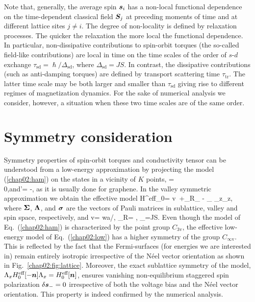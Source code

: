 Note that, generally, the average spin $\boldsymbol{s}_i$ has a non-local functional dependence on the time-dependent classical field $\boldsymbol{S}_j$ at preceding moments of time  and at different lattice sites $j\neq i$. The degree of non-locality is defined by relaxation processes. The quicker the relaxation the more local the functional dependence. In particular, non-dissipative contributions to spin-orbit torques (the so-called field-like contributions) are local in time on the time scales of the order of $s$-$d$ exchange  $\tau_\textrm{sd}=\hslash/\Delta_\text{sd}$, where $\Delta_\text{sd}=J S$. In contrast, the dissipative contributions (such as anti-damping torques) are defined by transport scattering time $\tau_\textrm{tr}$. The latter time scale may be both larger and smaller than $\tau_\textrm{sd}$ giving rise to different regimes of magnetization dynamics. For the sake of numerical analysis we consider, however, a situation when these two time scales are of the same order.

\section{Symmetry consideration} 

Symmetry properties of spin-orbit torques and conductivity tensor can be understood from a low-energy approximation by projecting the model (\ref{chap02:ham}) on the states in a vicinity of $K$ points, 
\be
{}= \\ 0\epm,\quad\mbox{and}\quad {}'= -,
\e
as it is usually done for graphene. In the valley symmetric approximation we obtain the effective model
\be
\label{chap02:low}
H^\textrm{eff}_0= v\, \cdot\bb{\Sigma}+\alpha_\textrm{R}\lt[\bb{\sigma}\times\bb{\Sigma}\rt]_{} - \Delta_\,\cdot\bb{\sigma}\,\Sigma_z\Lambda_z,
\e
where $\boldsymbol{\Sigma}$, $\boldsymbol{\Lambda}$, and $\boldsymbol{\sigma}$ are the vectors of Pauli matrices in sublattice, valley and spin space, respectively, and 
\be
v=  wa/\hslash, \qquad \alpha_\textrm{R}=  \lambda , \qquad \Delta_=JS.
\e
Even though the model of Eq.~(\ref{chap02:ham}) is characterized by the point group $C_\textrm{3v}$, the effective low-energy model of Eq.~(\ref{chap02:low}) has a higher symmetry 
of the group $C_{\infty\textrm{v}}$. This is reflected by the fact that the Fermi-surfaces (for energies we are interested in) remain entirely isotropic irrespective of the N\'eel vector orientation as shown in Fig.~\ref{chap02:fig:lattice}. Moreover, the exact sublattice symmetry of the model, $\Lambda_x H^\textrm{eff}_0[-\boldsymbol{n}] \Lambda_x =H^\textrm{eff}_0[\boldsymbol{n}]$, ensures vanishing non-equilibrium staggered spin polarization $\delta \boldsymbol{s}_-=0$ irrespective of both the voltage bias and the N\'eel vector orientation. This property is indeed confirmed by the numerical analysis. 

